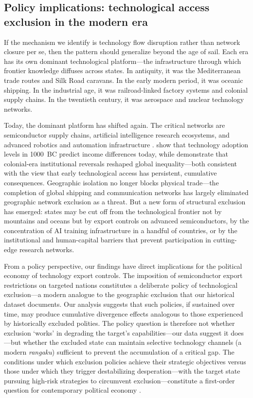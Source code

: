 \documentclass[pdflatex,sn-basic]{sn-jnl}
\theoremstyle{thmstyleone}%
\theoremstyle{thmstyletwo}%
\theoremstyle{thmstylethree}%
\begin{document}
\subsection{Policy implications: technological access exclusion in the modern era}\label{sec:disc-modern}

If the mechanism we identify is technology flow disruption rather than network closure per se, then the pattern should generalize beyond the age of sail. Each era has its own dominant technological platform---the infrastructure through which frontier knowledge diffuses across states. In antiquity, it was the Mediterranean trade routes and Silk Road caravans. In the early modern period, it was oceanic shipping. In the industrial age, it was railroad-linked factory systems and colonial supply chains. In the twentieth century, it was aerospace and nuclear technology networks.

Today, the dominant platform has shifted again. The critical networks are semiconductor supply chains, artificial intelligence research ecosystems, and advanced robotics and automation infrastructure \citep{AcemogluRestrepo2020, CominMestieri2018}. \citet{CominEasterlyGong2010} show that technology adoption levels in 1000~BC predict income differences today, while \citet{AcemogluJohnsonRobinson2002} demonstrate that colonial-era institutional reversals reshaped global inequality---both consistent with the view that early technological access has persistent, cumulative consequences. Geographic isolation no longer blocks physical trade---the completion of global shipping and communication networks has largely eliminated geographic network exclusion as a threat. But a new form of structural exclusion has emerged: states may be cut off from the technological frontier not by mountains and oceans but by export controls on advanced semiconductors, by the concentration of AI training infrastructure in a handful of countries, or by the institutional and human-capital barriers that prevent participation in cutting-edge research networks.

From a policy perspective, our findings have direct implications for the political economy of technology export controls. The imposition of semiconductor export restrictions on targeted nations constitutes a deliberate policy of technological exclusion---a modern analogue to the geographic exclusion that our historical dataset documents. Our analysis suggests that such policies, if sustained over time, may produce cumulative divergence effects analogous to those experienced by historically excluded polities. The policy question is therefore not whether exclusion `works' in degrading the target's capabilities---our data suggest it does---but whether the excluded state can maintain selective technology channels (a modern \emph{rangaku}) sufficient to prevent the accumulation of a critical gap. The conditions under which exclusion policies achieve their strategic objectives versus those under which they trigger destabilizing desperation---with the target state pursuing high-risk strategies to circumvent exclusion---constitute a first-order question for contemporary political economy \citep{BuenodeMesquita2003}.
\end{document}
